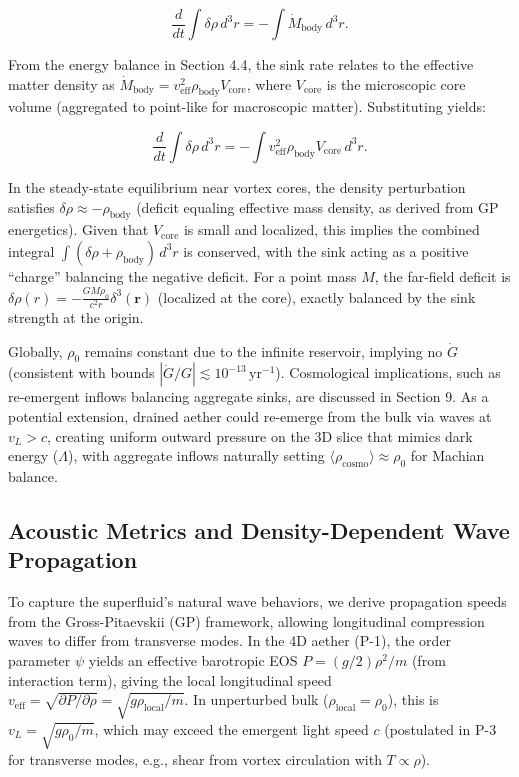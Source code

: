 \documentclass{article}
\begin{document}
\[
\frac{d}{dt} \int \delta\rho \, d^3 r = - \int \dot{M}_{\text{body}} \, d^3 r.
\]

From the energy balance in Section 4.4, the sink rate relates to the effective matter density as $\dot{M}_{\text{body}} = v_{\text{eff}}^2 \rho_{\text{body}} V_{\text{core}}$, where $V_{\text{core}}$ is the microscopic core volume (aggregated to point-like for macroscopic matter). Substituting yields:

\[
\frac{d}{dt} \int \delta\rho \, d^3 r = - \int v_{\text{eff}}^2 \rho_{\text{body}} V_{\text{core}} \, d^3 r.
\]

In the steady-state equilibrium near vortex cores, the density perturbation satisfies $\delta\rho \approx - \rho_{\text{body}}$ (deficit equaling effective mass density, as derived from GP energetics). Given that $V_{\text{core}}$ is small and localized, this implies the combined integral $\int (\delta\rho + \rho_{\text{body}}) \, d^3 r$ is conserved, with the sink acting as a positive ``charge'' balancing the negative deficit. For a point mass $M$, the far-field deficit is $\delta\rho(r) = - \frac{G M \rho_0}{c^2 r} \delta^3(\mathbf{r})$ (localized at the core), exactly balanced by the sink strength at the origin.

Globally, $\rho_0$ remains constant due to the infinite reservoir, implying no $\dot{G}$ (consistent with bounds $|\dot{G}/G| \lesssim 10^{-13} \, \mathrm{yr}^{-1}$). Cosmological implications, such as re-emergent inflows balancing aggregate sinks, are discussed in Section 9. As a potential extension, drained aether could re-emerge from the bulk via waves at $v_L > c$, creating uniform outward pressure on the 3D slice that mimics dark energy ($\Lambda$), with aggregate inflows naturally setting $\langle \rho_{\text{cosmo}} \rangle \approx \rho_0$ for Machian balance.

\subsection{Acoustic Metrics and Density-Dependent Wave Propagation}

To capture the superfluid's natural wave behaviors, we derive propagation speeds from the Gross-Pitaevskii (GP) framework, allowing longitudinal compression waves to differ from transverse modes. In the 4D aether (P-1), the order parameter $\psi$ yields an effective barotropic EOS $P = (g / 2) \rho^2 / m$ (from interaction term), giving the local longitudinal speed $v_{\text{eff}} = \sqrt{\partial P / \partial \rho} = \sqrt{g \rho_{\text{local}} / m}$. In unperturbed bulk ($\rho_{\text{local}} = \rho_0$), this is $v_L = \sqrt{g \rho_0 / m}$, which may exceed the emergent light speed $c$ (postulated in P-3 for transverse modes, e.g., shear from vortex circulation with $T \propto \rho$).
\end{document}
